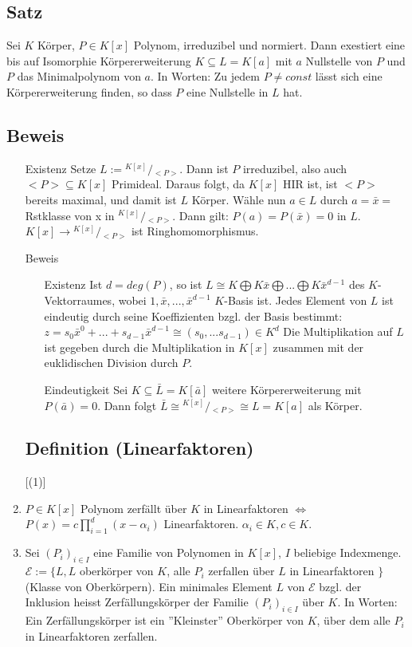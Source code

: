\documentclass[12pt,a4paper,ngerman]{scrreprt}
\newcommand{\modulus}[2]{{}^{#1} \!/\!_{#2}}
\begin{document}

\subsection{Satz}
Sei $K$ Körper, $P\in K[x]$ Polynom, irreduzibel und normiert.
Dann exestiert eine bis auf Isomorphie Körpererweiterung $K \subseteq L = K[a]$
mit $a$ Nullstelle von $P$ und $P$ das Minimalpolynom von $a$.
In Worten: Zu jedem $P \neq const$ lässt sich eine Körpererweiterung finden,
so dass $P$ eine Nullstelle in $L$ hat.

\subsection{Beweis}
\begin{enumerate}
\item[Existenz] Setze $L := \modulus{K[x]}{<P>}$. Dann ist $P$ irreduzibel,
also auch $<P> \subseteq K[x]$ Primideal. 
Daraus folgt, da $K[x]$ HIR ist, ist $<P>$ bereits maximal, und damit ist $L$ Körper.
Wähle nun $a \in L$ durch $a = \bar{x} = $Rstklasse von x in $\modulus{K[x]}{<P>}$.
Dann gilt: $P(a) = P(\bar{x}) = 0$ in $L$.
$K[x] \to \modulus{K[x]}{<P>}$ ist Ringhomomorphismus. 

Beweis
\begin{enumerate}
\item[Existenz] Ist $d = deg(P)$, so ist $L \cong K \bigoplus K \bar{x} \bigoplus ... \bigoplus K \bar{x}^{d-1}$
des $K$-Vektorraumes, wobei $1, \bar{x}, ..., \bar{x}^{d-1}$ $K$-Basis ist.
Jedes Element von $L$ ist eindeutig durch seine Koeffizienten bzgl. der Basis bestimmt:
$z = s_0 \bar{x}^0 + ... + s_{d-1} \bar{x}^{d-1} \cong (s_0, ... s_{d-1}) \in K^d$
Die Multiplikation auf $L$ ist gegeben durch die Multiplikation in $K[x]$ 
zusammen mit der euklidischen Division durch $P$.

\item[Eindeutigkeit]
Sei $K \subseteq \bar{L} = K[\bar{a}]$ weitere Körpererweiterung mit $P(\bar{a})=0$.
Dann folgt $\bar{L} \cong \modulus{K[x]}{<P>} \cong L = K[a]$ als Körper.
\end{enumerate}

\subsection{Definition (Linearfaktoren)}[(1)]
\item $P \in K[x]$ Polynom zerfällt über $K$ in Linearfaktoren $\Leftrightarrow$ 
$P(x) = c \prod_{i=1}^d (x-\alpha_i)$ Linearfaktoren. 
$\alpha_i \in K, c \in K$.
\item Sei $(P_i)_{i\in I}$ eine Familie von Polynomen in $K[x]$, $I$ beliebige Indexmenge.
$\mathcal{E} := \{L, L$ oberkörper von $K$, alle $P_i$ zerfallen über $L$ in Linearfaktoren $\}$
(Klasse von Oberkörpern).
Ein minimales Element $L$ von $\mathcal{E}$ bzgl. der Inklusion heisst 
Zerfällungskörper der Familie $(P_i)_{i \in I}$ über $K$.
In Worten: Ein Zerfällungskörper ist ein ''Kleinster'' Oberkörper von $K$,
über dem alle $P_i$ in Linearfaktoren zerfallen.
\end{enumerate}
\end{document}
